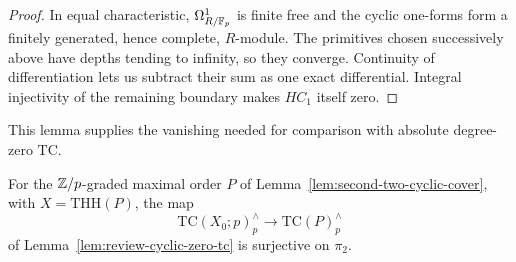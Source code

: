 \begin{proof}
In equal characteristic, $\Omega^1_{R/\mathbb F_p}$ is finite free and the cyclic one-forms form a finitely generated, hence complete, $R$-module.
The primitives chosen successively above have depths tending to infinity, so they converge.
Continuity of differentiation lets us subtract their sum as one exact differential.
Integral injectivity of the remaining boundary makes $HC_1$ itself zero.
\end{proof}

This lemma supplies the vanishing needed for comparison with absolute degree-zero $\mathrm{TC}$.

\begin{lemma}\label{lem:second-two-degree-zero-surjective}
For the $\mathbb Z/p$-graded maximal order $P$ of Lemma~\ref{lem:second-two-cyclic-cover}, with $X=\mathrm{THH}(P)$, the map
\[
 \mathrm{TC}(X_0;p)^\wedge_p\longrightarrow\mathrm{TC}(P)^\wedge_p
\]
of Lemma~\ref{lem:review-cyclic-zero-tc} is surjective on $\pi_2$.
\end{lemma}
